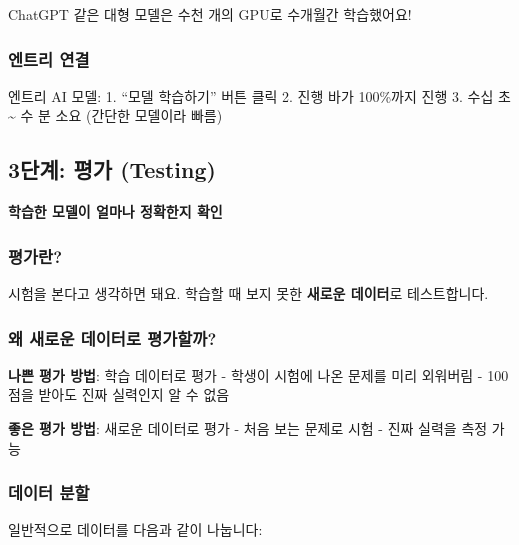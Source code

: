 \documentclass[a4paper, 11pt]{article}
\renewenvironment{quote}
  {\begin{tcolorbox}[colback=lightblue!30, colframe=mainblue!50,
   left=8pt, right=8pt, top=4pt, bottom=4pt, breakable]}
  {\end{tcolorbox}}
\begin{document}
ChatGPT 같은 대형 모델은 수천 개의 GPU로 수개월간 학습했어요!

\hypertarget{uxc5d4uxd2b8uxb9ac-uxc5f0uxacb0-1}{%
\subsubsection{엔트리 연결}\label{uxc5d4uxd2b8uxb9ac-uxc5f0uxacb0-1}}

엔트리 AI 모델: 1. ``모델 학습하기'' 버튼 클릭 2. 진행 바가 100\%까지
진행 3. 수십 초 \textasciitilde{} 수 분 소요 (간단한 모델이라 빠름)

\hypertarget{uxb2e8uxacc4-uxd3c9uxac00-testing}{%
\subsection{3단계: 평가
(Testing)}\label{uxb2e8uxacc4-uxd3c9uxac00-testing}}

\begin{quote}
\textbf{학습한 모델이 얼마나 정확한지 확인}
\end{quote}

\hypertarget{uxd3c9uxac00uxb780}{%
\subsubsection{평가란?}\label{uxd3c9uxac00uxb780}}

시험을 본다고 생각하면 돼요. 학습할 때 보지 못한 \textbf{새로운
데이터}로 테스트합니다.

\hypertarget{uxc65c-uxc0c8uxb85cuxc6b4-uxb370uxc774uxd130uxb85c-uxd3c9uxac00uxd560uxae4c}{%
\subsubsection{왜 새로운 데이터로
평가할까?}\label{uxc65c-uxc0c8uxb85cuxc6b4-uxb370uxc774uxd130uxb85c-uxd3c9uxac00uxd560uxae4c}}

\textbf{나쁜 평가 방법}: 학습 데이터로 평가 - 학생이 시험에 나온 문제를
미리 외워버림 - 100점을 받아도 진짜 실력인지 알 수 없음

\textbf{좋은 평가 방법}: 새로운 데이터로 평가 - 처음 보는 문제로 시험 -
진짜 실력을 측정 가능

\hypertarget{uxb370uxc774uxd130-uxbd84uxd560}{%
\subsubsection{데이터 분할}\label{uxb370uxc774uxd130-uxbd84uxd560}}

일반적으로 데이터를 다음과 같이 나눕니다:
\end{document}
